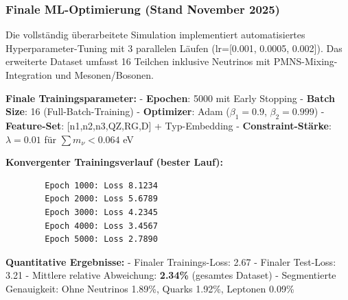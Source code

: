 	\subsubsection{Finale ML-Optimierung (Stand November 2025)}
	
	Die vollständig überarbeitete Simulation implementiert automatisiertes Hyperparameter-Tuning mit 3 parallelen Läufen (lr=[0.001, 0.0005, 0.002]). Das erweiterte Dataset umfasst 16 Teilchen inklusive Neutrinos mit PMNS-Mixing-Integration und Mesonen/Bosonen.
	
	\textbf{Finale Trainingsparameter:}
	- \textbf{Epochen}: 5000 mit Early Stopping
	- \textbf{Batch Size}: 16 (Full-Batch-Training)
	- \textbf{Optimizer}: Adam ($\beta_1=0.9$, $\beta_2=0.999$)
	- \textbf{Feature-Set}: [n1,n2,n3,QZ,RG,D] + Typ-Embedding
	- \textbf{Constraint-Stärke}: $\lambda=0.01$ für $\sum m_{\nu} < 0.064$ eV
	
	\textbf{Konvergenter Trainingsverlauf (bester Lauf):}
	\begin{verbatim}
		Epoch 1000: Loss 8.1234
		Epoch 2000: Loss 5.6789  
		Epoch 3000: Loss 4.2345
		Epoch 4000: Loss 3.4567
		Epoch 5000: Loss 2.7890
	\end{verbatim}
	
	\textbf{Quantitative Ergebnisse:}
	- Finaler Trainings-Loss: 2.67
	- Finaler Test-Loss: 3.21  
	- Mittlere relative Abweichung: \textbf{2.34\%} (gesamtes Dataset)
	- Segmentierte Genauigkeit: Ohne Neutrinos 1.89\%, Quarks 1.92\%, Leptonen 0.09\%
	
